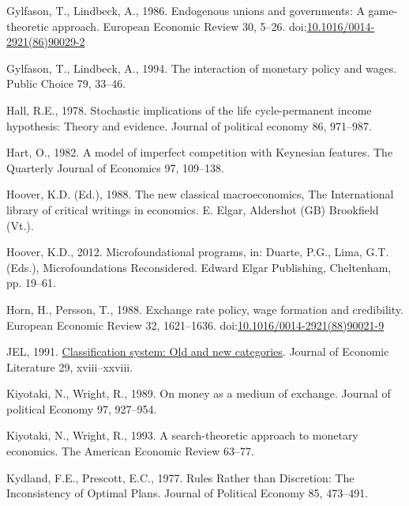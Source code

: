 \documentclass[]{elsarticle} %
\newlength{\cslhangindent}
\newlength{\cslentryspacingunit} %
\newenvironment{CSLReferences}[2] %
 {%
  \setlength{\parindent}{0pt}
  \ifodd #1
  \let\oldpar\par
  \def\par{\hangindent=\cslhangindent\oldpar}
  \fi
  \setlength{\parskip}{#2\cslentryspacingunit}
 }%
 {}
\begin{document}
\begin{CSLReferences}{1}{0}
\leavevmode{}%
Gylfason, T., Lindbeck, A., 1986. Endogenous unions and governments: {A}
game-theoretic approach. European Economic Review 30, 5--26.
doi:\href{https://doi.org/10.1016/0014-2921(86)90029-2}{10.1016/0014-2921(86)90029-2}

\leavevmode{}%
Gylfason, T., Lindbeck, A., 1994. The interaction of monetary policy and
wages. Public Choice 79, 33--46.

\leavevmode{}%
Hall, R.E., 1978. Stochastic implications of the life cycle-permanent
income hypothesis: Theory and evidence. Journal of political economy 86,
971--987.

\leavevmode{}%
Hart, O., 1982. A model of imperfect competition with {Keynesian}
features. The Quarterly Journal of Economics 97, 109--138.

\leavevmode{}%
Hoover, K.D. (Ed.), 1988. The new classical macroeconomics, The
{International} library of critical writings in economics. E. Elgar,
Aldershot (GB) Brookfield (Vt.).

\leavevmode{}%
Hoover, K.D., 2012. Microfoundational programs, in: Duarte, P.G., Lima,
G.T. (Eds.), Microfoundations {Reconsidered}. Edward Elgar Publishing,
Cheltenham, pp. 19--61.

\leavevmode{}%
Horn, H., Persson, T., 1988. Exchange rate policy, wage formation and
credibility. European Economic Review 32, 1621--1636.
doi:\href{https://doi.org/10.1016/0014-2921(88)90021-9}{10.1016/0014-2921(88)90021-9}

\leavevmode{}%
JEL, 1991. \href{https://www.jstor.org/stable/2727351}{Classification
system: Old and new categories}. Journal of Economic Literature 29,
xviii--xxviii.

\leavevmode{}%
Kiyotaki, N., Wright, R., 1989. On money as a medium of exchange.
Journal of political Economy 97, 927--954.

\leavevmode{}%
Kiyotaki, N., Wright, R., 1993. A search-theoretic approach to monetary
economics. The American Economic Review 63--77.

\leavevmode{}%
Kydland, F.E., Prescott, E.C., 1977. Rules {Rather} than {Discretion}:
{The Inconsistency} of {Optimal Plans}. Journal of Political Economy 85,
473--491.


\end{CSLReferences}
\end{document}
